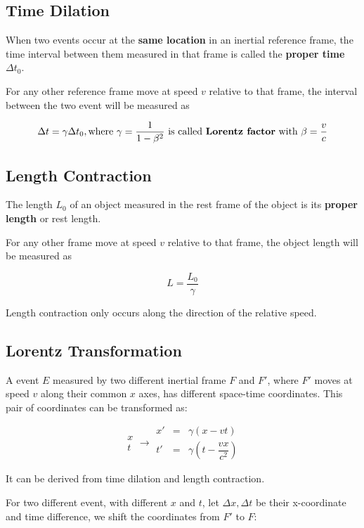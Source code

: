 \documentclass[12pt,a4paper]{report}
\begin{document}
  \subsection*{Time Dilation}
  When two events occur at the \textbf{same location} in an inertial reference frame, the time interval between them measured in that frame is called the \textbf{proper time} $\Delta t_0$.  

  For any other reference frame move at speed $v$ relative to that frame, the interval between the two event will be measured as

  \[ \Delta t = \gamma \Delta t_0, \text{where }\gamma = \frac{1}{1 - \beta^2} \text{ is called \textbf{Lorentz factor} with } \beta = \frac v c \]

  \subsection*{Length Contraction}
  The length $L_0$ of an object measured in the rest frame of the object is its \textbf{proper length} or rest length.

  For any other frame move at speed $v$ relative to that frame, the object length will be measured as 

  \[ L = \frac {L_0} \gamma \]

  Length contraction only occurs along the direction of the relative speed.  

  \subsection*{Lorentz Transformation}
  A event $E$ measured by two different inertial frame $F$ and $F'$, where $F'$ moves at speed $v$ along their common $x$ axes, has different space-time coordinates. This pair of coordinates can be transformed as: 

  \[ \begin{matrix} x \\ t \end{matrix} \longrightarrow \begin{matrix} x' & = & \gamma (x - vt) \\ t' & = & \gamma \left(t - \dfrac{vx}{c^2}\right) \end{matrix} \]

  It can be derived from time dilation and length contraction.

  For two different event, with different $x$ and $t$, let $\Delta x, \Delta t$ be their x-coordinate and time difference, we shift the coordinates from $F'$ to $F$:   
\end{document}

